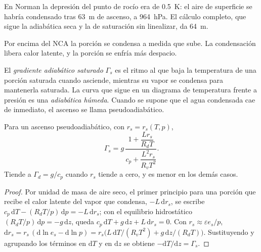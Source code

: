 En Norman la depresión del punto de rocío era de \qty{0.5}{K}: el aire de superficie se habría condensado tras
\qty{63}{m} de ascenso, a \qty{964}{hPa}. El cálculo completo, que sigue la adiabática seca y
la  de saturación sin linealizar, da \qty{64}{m}.

Por encima del NCA la porción se condensa a medida que sube. La condensación libera calor latente, y la porción
se enfría más despacio.

\begin{definition}\label{def:b2:atmospheric-thermodynamics:moist-adiabat}
El \emph{gradiente adiabático saturado} $\Gamma_s$ es
el ritmo al que baja la temperatura de una porción saturada cuando asciende, mientras su vapor se condensa
para mantenerla saturada. La curva que sigue en un diagrama de temperatura frente a presión es una
\emph{adiabática húmeda}. Cuando se supone que el agua condensada cae
de inmediato, el ascenso se llama pseudoadiabático.
\end{definition}

\begin{proposition}\label{prop:b2:atmospheric-thermodynamics:gamma-s}
Para un ascenso pseudoadiabático, con $r_s = r_s(T, p)$,
\[
  \Gamma_s = g\,\frac{1 + \dfrac{L r_s}{R_d T}}{c_p + \dfrac{L^2 r_s}{R_v T^2}} .
\]
Tiende a $\Gamma_d = g/c_p$ cuando $r_s$ tiende a cero, y es menor en los demás casos.
\end{proposition}

\begin{proof}
Por unidad de masa de aire seco, el primer principio para una porción que recibe el calor latente del vapor
que condensa, $-L\,\mathrm{d}r_s$, se escribe $c_p\,\mathrm{d}T - (R_dT/p)\,\mathrm{d}p = -L\,
\mathrm{d}r_s$; con el equilibrio hidrostático $(R_dT/p)\,\mathrm{d}p = -g\,\mathrm{d}z$, queda
$c_p\,\mathrm{d}T + g\,\mathrm{d}z + L\,\mathrm{d}r_s = 0$. Con $r_s \approx \varepsilon e_s/p$,
$\mathrm{d}r_s = r_s\,(\mathrm{d}\ln e_s - \mathrm{d}\ln p) = r_s\bigl(L\,\mathrm{d}T/(R_vT^2) +
g\,\mathrm{d}z/(R_dT)\bigr)$. Sustituyendo y agrupando los términos en $\mathrm{d}T$ y en
$\mathrm{d}z$ se obtiene $-\mathrm{d}T/\mathrm{d}z = \Gamma_s$.
\end{proof}


